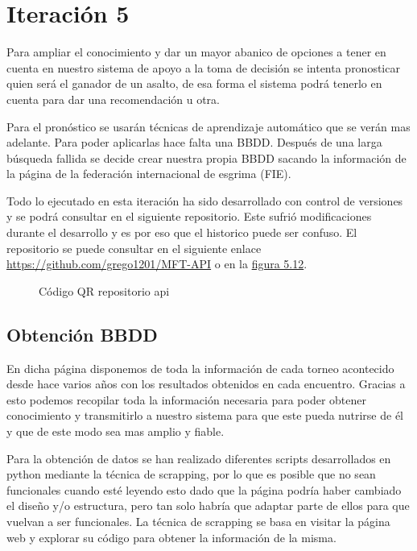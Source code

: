 \section{Iteración 5}


Para ampliar el conocimiento y dar un mayor abanico de opciones
a tener en cuenta en nuestro sistema de apoyo a la toma de decisión
se intenta pronosticar quien será el ganador de un asalto, de esa forma
el sistema podrá tenerlo en cuenta para dar una recomendación u otra.


Para el pronóstico se usarán técnicas de aprendizaje automático que se
verán mas adelante. Para poder aplicarlas hace falta una BBDD. Después de
una larga búsqueda fallida se decide crear nuestra propia BBDD sacando
la información de la página de la federación internacional de esgrima (FIE).

Todo lo ejecutado en esta iteración ha sido desarrollado con control de versiones
y se podrá consultar en el siguiente repositorio. Este sufrió modificaciones durante
el desarrollo y es por eso que el historico puede ser confuso. El repositorio se puede
consultar en el siguiente enlace \url{https://github.com/grego1201/MFT-API} o en la \hyperref[fig:Código QR repositorio api]{figura 5.12}.

\begin{figure}[htb]
  \centering
  \caption[Código QR repositorio api]{Código QR repositorio api}
  \label{fig:Código QR repositorio api}
\end{figure}

\subsection{Obtención BBDD}

En dicha página disponemos de toda la información de cada torneo acontecido
desde hace varios años con los resultados obtenidos en cada encuentro. Gracias
a esto podemos recopilar toda la información necesaria para poder obtener conocimiento
y transmitirlo a nuestro sistema para que este pueda nutrirse de él y que de este
modo sea mas amplio y fiable.

Para la obtención de datos se han realizado diferentes scripts desarrollados en
python mediante la técnica de scrapping, por lo que es posible que no sean funcionales
cuando esté leyendo esto dado que la página podría haber cambiado el diseño y/o
estructura, pero tan solo habría que adaptar parte de ellos para que vuelvan a
ser funcionales. La técnica de scrapping se basa en visitar la página web y
explorar su código para obtener la información de la misma.

